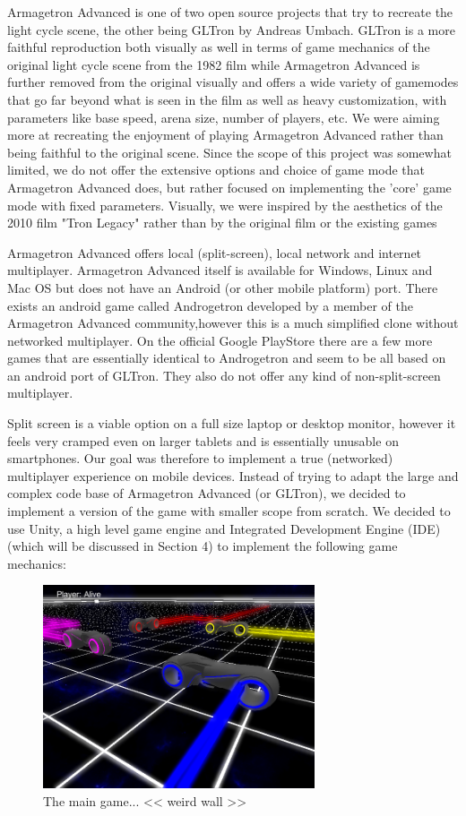 \documentclass{report}
\begin{document}
Armagetron Advanced\cite{AA} is one of two open source projects that try to recreate the light cycle scene, the other being GLTron\cite{GLT} by Andreas Umbach\cite{Umbach}.
GLTron is a more faithful reproduction both visually as well in terms of game mechanics of the original light cycle scene from the 1982 film while Armagetron Advanced is further removed from the original visually and offers a wide variety of gamemodes that go far beyond what is seen in the film as well as heavy customization, with parameters like base speed, arena size, number of players, etc.
We were aiming more at recreating the enjoyment of playing Armagetron Advanced rather than being faithful to the original scene.
Since the scope of this project was somewhat limited, we do not offer the extensive options and choice of game mode that Armagetron Advanced does, 
but rather focused on implementing the 'core' game mode with fixed parameters. Visually, we were inspired by the aesthetics of the 2010 film "Tron Legacy" rather than by the original film or the existing games

Armagetron Advanced offers local (split-screen), local network and internet multiplayer.
Armagetron Advanced itself is available for Windows, Linux and Mac OS but does not have an Android (or other mobile platform) port.
 There exists an android game called Androgetron\cite{Andro} developed by a member of the Armagetron Advanced community,however this is a much simplified clone without networked multiplayer.
  On the official Google Play\texttrademark Store there are a few more games\cite{GP1}\cite{GP2}\cite{GP3} that are essentially identical to Androgetron and seem to be all based on an android port of GLTron. They also do not offer any kind of non-split-screen multiplayer.

Split screen is a viable option on a full size laptop or desktop monitor, however it feels very cramped even on larger tablets and is essentially unusable on smartphones.
Our goal was therefore to implement a true (networked) multiplayer experience on mobile devices.
Instead of trying to adapt the large and complex code base of Armagetron Advanced (or GLTron), we decided to implement a version of the game with smaller scope from scratch.
We decided to use Unity, a high level game engine and Integrated Development Engine (IDE) (which will be discussed in Section 4) to implement the following game mechanics:

\begin{figure}
 	 	    \includegraphics[height=6cm]{tron_four}
 	  
 	 	\caption{The main game... << weird wall >> }
 \end{figure}
 
\end{document}
